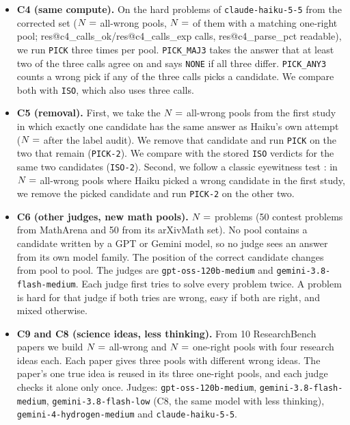 \documentclass[10pt,twocolumn]{article}
\makeatletter
\newcommand{\res}[1]{\csname res@#1\endcsname}
\makeatother
\begin{document}
\begin{itemize}\setlength{\itemsep}{2pt}
\item \textbf{C4 (same compute).} On the hard problems of \texttt{claude-haiku-5-5} from the corrected set ($N=\res{c4_n_ta}$ all-wrong pools, $N=\res{c4_n_tp}$ of them with a matching one-right pool; \res{c4_calls_ok}/\res{c4_calls_exp} calls, \res{c4_parse_pct} readable), we run \texttt{PICK} three times per pool. \texttt{PICK\_MAJ3} takes the answer that at least two of the three calls agree on and says \texttt{NONE} if all three differ. \texttt{PICK\_ANY3} counts a wrong pick if any of the three calls picks a candidate. We compare both with \texttt{ISO}, which also uses three calls.
\item \textbf{C5 (removal).} First, we take the $N=\res{c5o_all_n}$ all-wrong pools from the first study in which exactly one candidate has the same answer as Haiku's own attempt ($N=\res{c5o_corr_n}$ after the label audit). We remove that candidate and run \texttt{PICK} on the two that remain (\texttt{PICK-2}). We compare with the stored \texttt{ISO} verdicts for the same two candidates (\texttt{ISO-2}). Second, we follow a classic eyewitness test \citep{wells1993what,wells1984psychology}: in $N=\res{c5w_n}$ all-wrong pools where Haiku picked a wrong candidate in the first study, we remove the picked candidate and run \texttt{PICK-2} on the other two.
\item \textbf{C6 (other judges, new math pools).} $N=\res{c6_n_problems}$ problems (50 contest problems from MathArena and 50 from its arXivMath set). No pool contains a candidate written by a GPT or Gemini model, so no judge sees an answer from its own model family. The position of the correct candidate changes from pool to pool. The judges are \texttt{gpt-oss-120b-medium} and \texttt{gemini-3.8-flash-medium}. Each judge first tries to solve every problem twice. A problem is hard for that judge if both tries are wrong, easy if both are right, and mixed otherwise.
\item \textbf{C9 and C8 (science ideas, less thinking).} From 10 ResearchBench papers \citep{liu2025researchbench} we build $N=\res{c9_n_items}$ all-wrong and $N=\res{c9_n_items}$ one-right pools with four research ideas each. Each paper gives three pools with different wrong ideas. The paper's one true idea is reused in its three one-right pools, and each judge checks it alone only once. Judges: \texttt{gpt-oss-120b-medium}, \texttt{gemini-3.8-flash-medium}, \texttt{gemini-3.8-flash-low} (C8, the same model with less thinking), \texttt{gemini-4-hydrogen-medium} and \texttt{claude-haiku-5-5}.

\end{itemize}
\end{document}
